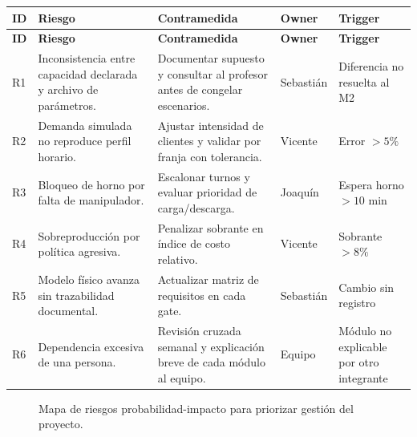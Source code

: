 \documentclass[11pt,letterpaper]{article}
\begin{document}
\begin{longtable}{L{0.9cm}L{4.45cm}L{4.65cm}L{2.0cm}L{1.95cm}}
  \toprule
  \textbf{ID} & \textbf{Riesgo} & \textbf{Contramedida} & \textbf{Owner} & \textbf{Trigger} \\
  \midrule
  \endfirsthead
  \toprule
  \textbf{ID} & \textbf{Riesgo} & \textbf{Contramedida} & \textbf{Owner} & \textbf{Trigger} \\
  \midrule
  \endhead
  R1 & Inconsistencia entre capacidad declarada y archivo de parámetros. & Documentar supuesto y consultar al profesor antes de congelar escenarios. & Sebastián & Diferencia no resuelta al M2 \\
  R2 & Demanda simulada no reproduce perfil horario. & Ajustar intensidad de clientes y validar por franja con tolerancia. & Vicente & Error \(>5\%\) \\
  R3 & Bloqueo de horno por falta de manipulador. & Escalonar turnos y evaluar prioridad de carga/descarga. & Joaquín & Espera horno \(>10\) min \\
  R4 & Sobreproducción por política agresiva. & Penalizar sobrante en índice de costo relativo. & Vicente & Sobrante \(>8\%\) \\
  R5 & Modelo físico avanza sin trazabilidad documental. & Actualizar matriz de requisitos en cada gate. & Sebastián & Cambio sin registro \\
  R6 & Dependencia excesiva de una persona. & Revisión cruzada semanal y explicación breve de cada módulo al equipo. & Equipo & Módulo no explicable por otro integrante \\
  \bottomrule
\end{longtable}

\begin{figure}[htbp]
  \centering
  \caption{Mapa de riesgos probabilidad-impacto para priorizar gestión del proyecto.}
\end{figure}
\end{document}
